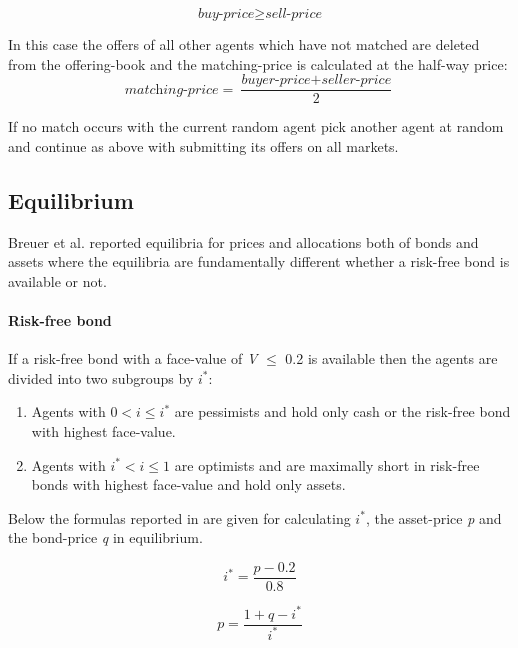 \documentclass[../Bachelorarbeit.tex]{subfiles}
\begin{document}
\begin{equation}
\textit{buy-price} \geq \textit{sell-price}
\end{equation}

In this case the offers of all other agents which have not matched are deleted from the offering-book and the matching-price is calculated at the half-way price:
\begin{equation}
\textit{matching-price} = \frac{\textit{buyer-price} + \textit{seller-price}}{2}
\end{equation}

If no match occurs with the current random agent pick another agent at random and continue as above with submitting its offers on all markets.

\subsection{Equilibrium}
\label{sec:EQUILIBRIUM}
Breuer et al. reported equilibria for prices and allocations both of bonds and assets where the equilibria are fundamentally different whether a risk-free bond is available or not.

\paragraph{Risk-free bond}
If a risk-free bond with a face-value of \textit{V} $\leq$ 0.2 is available then the agents are divided into two subgroups by $i^*$:

\begin{enumerate}
\item Agents with $0 < i \leq i^*$ are pessimists and hold only cash or the risk-free bond with highest face-value.
\item Agents with $i^* < i \leq 1$ are optimists and are maximally short in risk-free bonds with highest face-value and hold only assets.
\end{enumerate}

Below the formulas reported in \cite{Breuer2015} are given for calculating $i^*$, the asset-price \textit{p} and the bond-price \textit{q} in equilibrium.

\begin{equation}
i^* = \frac{p - 0.2}{0.8}
\end{equation}

\begin{equation}
p = \frac{1 + q - i^*}{i^*}
\end{equation}
\end{document}
